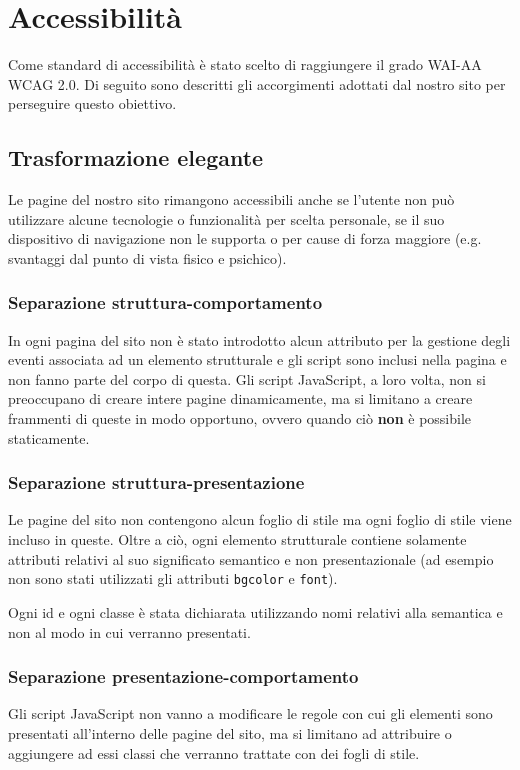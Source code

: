 \section{Accessibilità}
Come standard di accessibilità è stato scelto di raggiungere il grado WAI-AA
WCAG 2.0. Di seguito sono descritti gli accorgimenti adottati dal nostro sito
per perseguire questo obiettivo.

\subsection{Trasformazione elegante}
Le pagine del nostro sito rimangono accessibili anche se l'utente non può
utilizzare alcune tecnologie o funzionalità per scelta personale, se il
suo dispositivo di navigazione non le supporta o per cause di forza maggiore
(e.g. svantaggi dal punto di vista fisico e psichico).

\subsubsection{Separazione struttura-comportamento}
In ogni pagina del sito non è stato introdotto alcun attributo per la gestione
degli eventi associata ad un elemento strutturale e gli script sono inclusi
nella pagina e non fanno parte del corpo di questa.
Gli script JavaScript, a loro volta, non si preoccupano di creare intere pagine
dinamicamente, ma si limitano a creare frammenti di queste in modo opportuno,
ovvero quando ciò \textbf{non} è possibile staticamente.

\subsubsection{Separazione struttura-presentazione}
Le pagine del sito non contengono alcun foglio di stile ma ogni foglio di stile
viene incluso in queste. Oltre a ciò, ogni elemento strutturale contiene
solamente attributi relativi al suo significato semantico e non presentazionale
(ad esempio non sono stati utilizzati gli attributi \texttt{bgcolor} e
\texttt{font}).

Ogni id e ogni classe è stata dichiarata utilizzando nomi relativi alla
semantica e non al modo in cui verranno presentati.

\subsubsection{Separazione presentazione-comportamento}
Gli script JavaScript non vanno a modificare le regole con cui gli elementi
sono presentati all'interno delle pagine del sito, ma si limitano ad attribuire
o aggiungere ad essi classi che verranno trattate con dei fogli di stile.

